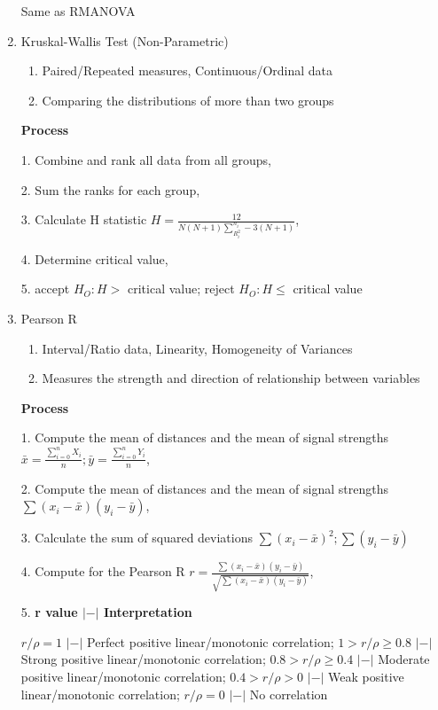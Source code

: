 \documentclass[4pt]{article}
\begin{document}
\begin{multicols*}{2}
\begin{enumerate}
        Same as RMANOVA

        \item Kruskal-Wallis Test (Non-Parametric)
        \begin{enumerate}
            \item Paired/Repeated measures, Continuous/Ordinal data
            \item Comparing the distributions of more than two groups
        \end{enumerate}
        \textbf{Process}
            
        1. Combine and rank all data from all groups, 
    
        2. Sum the ranks for each group,

        3. Calculate H statistic $ H = \frac{12}{N(N+1)\sum_{R_i^2}^{n_i}-3(N+1)}$,
    
        4. Determine critical value,

        5. accept $H_O: H >$ critical value; reject $H_O: H \leq$ critical value

        \item Pearson R
        \begin{enumerate}
            \item Interval/Ratio data, Linearity, Homogeneity of Variances
            \item Measures the strength and direction of relationship between variables
        \end{enumerate}
        \textbf{Process}
            
        1. Compute the mean of distances and the mean of signal strengths $ \bar{x} = \frac{\sum_{i=0}^n{X_i}}{n}; \bar{y} = \frac{\sum_{i=0}^n{Y_i}}{n}$, 
    
        2. Compute the mean of distances and the mean of signal strengths $ \sum{(x_i-\bar{x})(y_i-\bar{y})}$,

        3. Calculate the sum of squared deviations $ \sum{(x_i - \bar{x})^2}; \sum{(y_i-\bar{y})}$
    
        4. Compute for the Pearson R $ r = \frac{\sum{(x_i-\bar{x})(y_i-\bar{y})}}{\sqrt{\sum{(x_i-\bar{x})(y_i-\bar{y})}}}$,

        5. \textbf{r value $|-|$ Interpretation}

            $r/\rho = 1$ $|-|$ Perfect positive linear/monotonic correlation; $1 > r/\rho \geq 0.8$ $|-|$ Strong positive linear/monotonic correlation; $0.8 > r/\rho \geq 0.4$ $|-|$ Moderate positive linear/monotonic correlation;
            $0.4 > r/\rho > 0$ $|-|$ Weak positive linear/monotonic correlation; $r/\rho = 0$ $|-|$ No correlation


\end{enumerate}
\end{multicols*}
\end{document}
